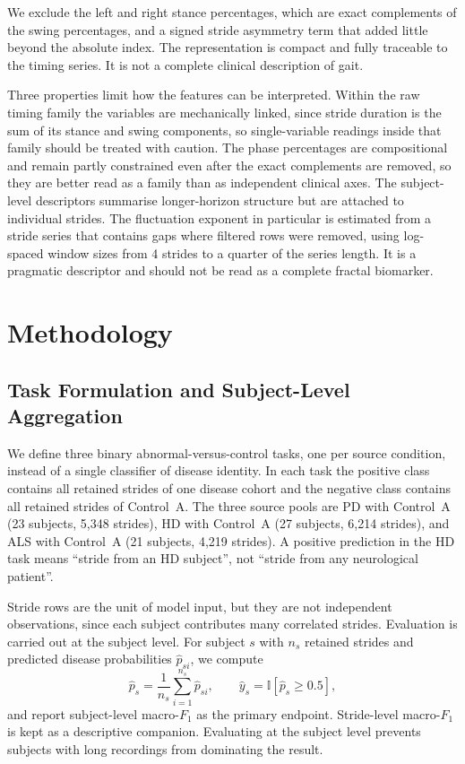 \documentclass[conference]{IEEEtran}
\begin{document}
We exclude the left and right stance percentages, which are exact complements of the swing percentages, and a signed stride asymmetry term that added little beyond the absolute index. The representation is compact and fully traceable to the timing series. It is not a complete clinical description of gait.

Three properties limit how the features can be interpreted. Within the raw timing family the variables are mechanically linked, since stride duration is the sum of its stance and swing components, so single-variable readings inside that family should be treated with caution. The phase percentages are compositional and remain partly constrained even after the exact complements are removed, so they are better read as a family than as independent clinical axes. The subject-level descriptors summarise longer-horizon structure but are attached to individual strides. The fluctuation exponent in particular is estimated from a stride series that contains gaps where filtered rows were removed, using log-spaced window sizes from 4 strides to a quarter of the series length. It is a pragmatic descriptor and should not be read as a complete fractal biomarker.

\section{Methodology}
\label{sec:method}

\subsection{Task Formulation and Subject-Level Aggregation}
We define three binary abnormal-versus-control tasks, one per source condition, instead of a single classifier of disease identity. In each task the positive class contains all retained strides of one disease cohort and the negative class contains all retained strides of Control~A. The three source pools are PD with Control~A (23 subjects, 5{,}348 strides), HD with Control~A (27 subjects, 6{,}214 strides), and ALS with Control~A (21 subjects, 4{,}219 strides). A positive prediction in the HD task means ``stride from an HD subject'', not ``stride from any neurological patient''.

Stride rows are the unit of model input, but they are not independent observations, since each subject contributes many correlated strides. Evaluation is carried out at the subject level. For subject $s$ with $n_s$ retained strides and predicted disease probabilities $\hat{p}_{si}$, we compute
\begin{equation}
\hat{p}_s = \frac{1}{n_s}\sum_{i=1}^{n_s}\hat{p}_{si},
\qquad
\hat{y}_s = \mathbb{I}\!\left[\hat{p}_s \ge 0.5\right],
\label{eq:subject-aggregation}
\end{equation}
and report subject-level macro-$F_1$ as the primary endpoint. Stride-level macro-$F_1$ is kept as a descriptive companion. Evaluating at the subject level prevents subjects with long recordings from dominating the result.
\end{document}
